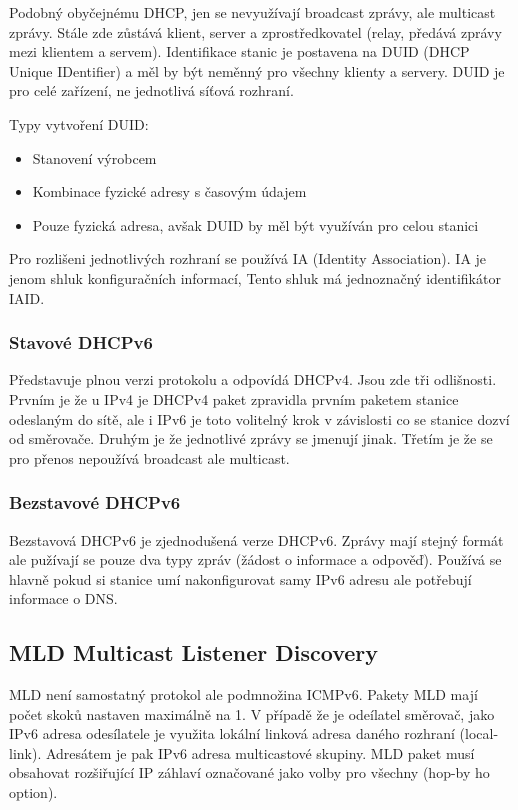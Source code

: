 Podobný obyčejnému DHCP, jen se nevyužívají broadcast zprávy, ale multicast zprávy.
Stále zde zůstává klient, server a zprostředkovatel (relay, předává zprávy mezi klientem a servem).
Identifikace stanic je postavena na DUID (DHCP Unique IDentifier) a měl by být neměnný pro všechny klienty a servery.
DUID je pro celé zařízení, ne jednotlivá síťová rozhraní.

Typy vytvoření DUID:

\begin{itemize}[noitemsep]
    \item Stanovení výrobcem
    \item Kombinace fyzické adresy s časovým údajem
    \item Pouze fyzická adresa, avšak DUID by měl být využíván pro celou stanici
\end{itemize}

Pro rozlišeni jednotlivých rozhraní se používá IA (Identity Association). IA je jenom shluk konfiguračních informací, Tento shluk má jednoznačný identifikátor IAID.

\subsubsection{Stavové DHCPv6}

Představuje plnou verzi protokolu a odpovídá DHCPv4.
Jsou zde tři odlišnosti.
Prvním je že u IPv4 je DHCPv4 paket zpravidla prvním paketem stanice odeslaným do sítě, ale i IPv6 je toto volitelný krok v závislosti co se stanice dozví od směrovače.
Druhým je že jednotlivé zprávy se jmenují jinak.
Třetím je že se pro přenos nepoužívá broadcast ale multicast.

\subsubsection{Bezstavové DHCPv6}

Bezstavová DHCPv6 je zjednodušená verze DHCPv6.
Zprávy mají stejný formát ale pužívají se pouze dva typy zpráv (žádost o informace a odpověď).
Používá se hlavně pokud si stanice umí nakonfigurovat samy IPv6 adresu ale potřebují informace o DNS.

\subsection{MLD Multicast Listener Discovery}

MLD není samostatný protokol ale podmnožina ICMPv6.
Pakety MLD mají počet skoků nastaven maximálně na 1.
V případě že je odeílatel směrovač, jako IPv6 adresa odesílatele je využita lokální linková adresa daného rozhraní (local-link).
Adresátem je pak IPv6 adresa multicastové skupiny.
MLD paket musí obsahovat rozšiřující IP záhlaví označované jako volby pro všechny (hop-by ho option).

